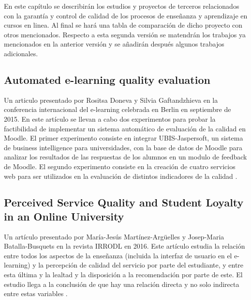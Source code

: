 
En este capítulo se describirán los estudios y proyectos de terceros relacionados con la garantía y control de calidad de los procesos de enseñanza y aprendizaje en cursos en linea. Al final se hará una tabla de comparación de dicho proyecto con otros mencionados. Respecto a esta segunda versión se matendrán los trabajos ya mencionados en la anterior versión y se añadirán después algunos trabajos adicionales.

\subsection{Automated e-learning quality evaluation}
Un articulo presentado por Rositsa Doneva y Silvia Gaftandzhieva en la conferencia internacional del e-learning celebrada en Berlin en septiembre de 2015.
En este artículo se llevan a cabo dos experimentos para probar la factibilidad de implementar un sistema automático de evaluación de la calidad en Moodle. El primer experimento consiste en integrar UBIS-Jaspersoft, un sistema de business intelligence para universidades, con la base de datos de Moodle para analizar los resultados de las respuestas de los alumnos en un modulo de feedback de Moodle. El segundo experimento consiste en la creación de cuatro servicios web para ser utilizados en la evaluación de distintos indicadores de la calidad \cite{doneva2015automated}.

\subsection{Perceived Service Quality and Student Loyalty in an Online University}
Un artículo presentado por María-Jesús Martínez-Argüelles y Josep-Maria Batalla-Busquets en la revista IRRODL en 2016.
Este artículo estudia la relación entre todos los aspectos de la enseñanza (incluida la interfaz de usuario en el e-learning) y la percepción de calidad del servicio por parte del estudiante, y entre esta última y la lealtad y la disposición a la recomendación por parte de este. El estudio llega a la conclusión de que hay una relación directa y no solo indirecta entre estas variables \cite{martinez2016perceived}.

